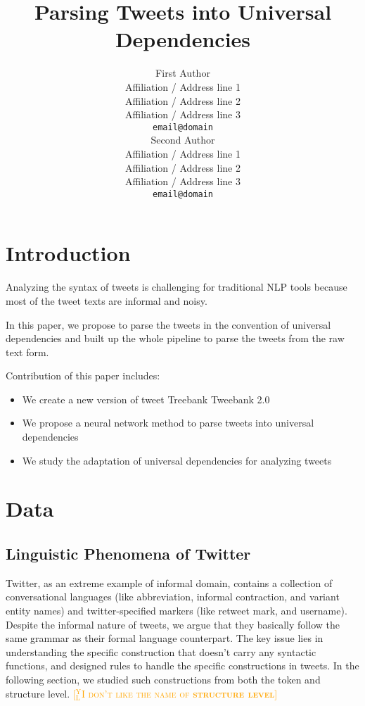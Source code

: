 \documentclass[11pt,letterpaper]{article}
\title{Parsing Tweets into Universal Dependencies}
\author{First Author \\
  Affiliation / Address line 1 \\
  Affiliation / Address line 2 \\
  Affiliation / Address line 3 \\
  {\tt email@domain} \\\And
  Second Author \\
  Affiliation / Address line 1 \\
  Affiliation / Address line 2 \\
  Affiliation / Address line 3 \\
  {\tt email@domain} \\}
\date{}
\newcommand{\yjcomment}[1]{\textcolor{orange}{[$_\mathrm{L}^\mathrm{Y}$\textsc{#1}]}}
\begin{document}
\maketitle
\begin{abstract}

\end{abstract}




\section{Introduction}
Analyzing the syntax of tweets is challenging for traditional NLP tools because most of the tweet texts are informal and noisy.

In this paper, we propose to parse the tweets in the convention of universal dependencies and built up the whole pipeline to parse the tweets from the raw text form.

Contribution of this paper includes:
\begin{itemize}
\item We create a new version of tweet Treebank Tweebank 2.0
\item We propose a neural network method to parse tweets into universal dependencies
\item We study the adaptation of universal dependencies for analyzing tweets
\end{itemize}



\section{Data}

\subsection{Linguistic Phenomena of Twitter} \label{lingphen}
Twitter, as an extreme example of informal domain, contains a collection of conversational languages (like abbreviation, informal contraction, and variant entity names) and twitter-specified markers (like retweet mark, and username).
Despite the informal nature of tweets, we argue that they basically follow the same grammar as their formal language counterpart.
The key issue lies in understanding the specific construction that doesn't carry any syntactic functions, and designed rules to handle the specific constructions in tweets.
In the following section, we studied such constructions from both the token and structure level. \yjcomment{I don't like the name of \textbf{structure level}}
\end{document}
